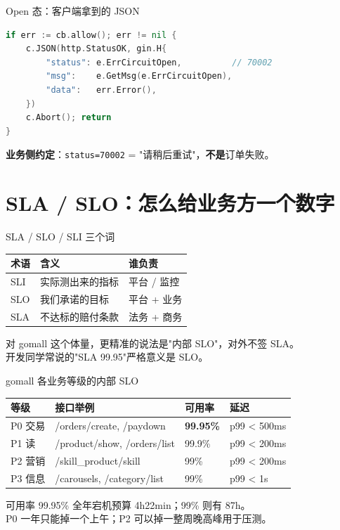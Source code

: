 \begin{frame}[fragile]{Open 态：客户端拿到的 JSON}
\begin{lstlisting}[language=Go,firstnumber=57,
  caption={\srcnote{middleware/circuitbreaker.go:57--64}}]
if err := cb.allow(); err != nil {
    c.JSON(http.StatusOK, gin.H{
        "status": e.ErrCircuitOpen,          // 70002
        "msg":    e.GetMsg(e.ErrCircuitOpen),
        "data":   err.Error(),
    })
    c.Abort(); return
}
\end{lstlisting}
\small \textbf{业务侧约定}：\texttt{status=70002} = "请稍后重试"，\textbf{不是}订单失败。
\end{frame}

\section{SLA / SLO：怎么给业务方一个数字}

\begin{frame}{SLA / SLO / SLI 三个词}
\begin{tabular}{@{}lll@{}}
\toprule
术语 & 含义 & 谁负责 \\
\midrule
SLI & 实际测出来的指标 & 平台 / 监控 \\
SLO & 我们承诺的目标   & 平台 + 业务 \\
SLA & 不达标的赔付条款 & 法务 + 商务 \\
\bottomrule
\end{tabular}
\vspace{3mm}
\small 对 gomall 这个体量，更精准的说法是"内部 SLO"，对外不签 SLA。\\
开发同学常说的"SLA 99.95"严格意义是 SLO。
\end{frame}

\begin{frame}{gomall 各业务等级的内部 SLO}
\begin{tabular}{@{}llll@{}}
\toprule
等级 & 接口举例 & 可用率 & 延迟 \\
\midrule
P0 交易 & /orders/create, /paydown      & \textbf{99.95\%} & p99 < 500ms \\
P1 读   & /product/show, /orders/list   & 99.9\%  & p99 < 200ms \\
P2 营销 & /skill\_product/skill         & 99\%    & p99 < 200ms \\
P3 信息 & /carousels, /category/list    & 99\%    & p99 < 1s    \\
\bottomrule
\end{tabular}
\vspace{3mm}
\small 可用率 99.95\% 全年宕机预算 4h22min；99\% 则有 87h。\\
P0 一年只能掉一个上午；P2 可以掉一整周晚高峰用于压测。
\end{frame}

